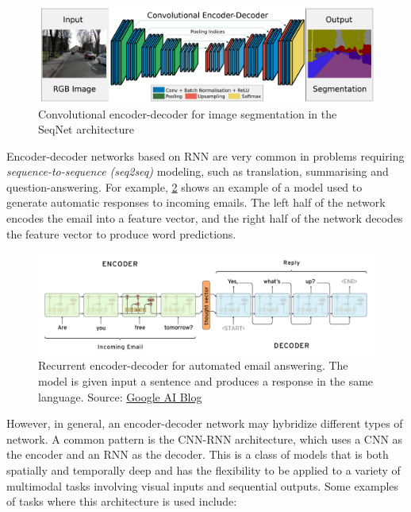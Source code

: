 \begin{figure}[hpt]
    \centering
    \includegraphics[scale=0.45]{images/ch3/cnn-cnn.png}
    \caption{Convolutional encoder-decoder for image segmentation in the SeqNet architecture \citep{Badrinarayanan2017}}
    \label{fig:cnn-cnn}
\end{figure}

Encoder-decoder networks based on RNN are very common in problems requiring \textit{sequence-to-sequence (seq2seq)} modeling, such as translation, summarising and question-answering. For example, \cref{fig:rnn-rnn} shows an example of a model used to generate automatic responses to incoming emails. The left half of the network encodes the email into a feature vector, and the right half of the network decodes the feature vector to produce word predictions. 

\begin{figure}[hpt]
    \centering
    \includegraphics[scale=0.3]{images/ch3/rnn-rnn.png}
    \caption{Recurrent encoder-decoder for automated email answering. The model is given input a sentence and produces a response in the same language. Source: \href{https://ai.googleblog.com/2015/11/computer-respond-to-this-email.html}{Google AI Blog}}
    \label{fig:rnn-rnn}
\end{figure}

However, in general, an encoder-decoder network may hybridize different types of network. A common pattern is the CNN-RNN architecture, which uses a CNN as the encoder and an RNN as the decoder. This is a class of models that is both spatially and temporally deep and has the flexibility to be applied to a variety of multimodal tasks involving visual inputs and sequential outputs. Some examples of tasks where this architecture is used include:

